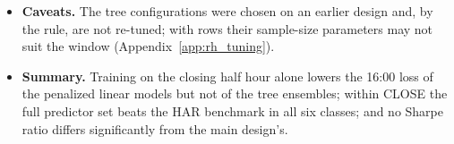 \begin{itemize}
\begin{itemize}
    \rhtaDShPMin).
  \item For the tree ensembles, the full-set strategy's gain over the HAR benchmark's is significant at the 5\% level
    in \rhtaNTreeShSigCl{} of the three classes under CLOSE, where the trees' HAR benchmark strategies have $\SR$
    from \rhtaShTreeHarClMin{} to \rhtaShTreeHarClMax.
  \end{itemize}
\item \textbf{Caveats.} The tree configurations were chosen on an earlier design and, by the rule, are not
  re-tuned; with \rhtaRowsCl{} rows their sample-size parameters may not suit the window
  (Appendix~\ref{app:rh_tuning}).
\item \textbf{Summary.} Training on the closing half hour alone lowers the 16:00 loss of the penalized linear models
  but not of the tree ensembles; within CLOSE the full predictor set beats the HAR benchmark in all six classes; and
  no Sharpe ratio differs significantly from the main design's.
\end{itemize}

